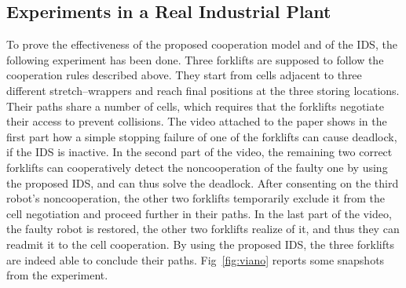 \documentclass[journal, onecolumn, 12pt]{styles/IEEEtran}
\begin{document}
\subsection{Experiments in a Real Industrial Plant}

To prove the effectiveness of the proposed cooperation model and of the IDS, the following experiment has been done. Three forklifts are supposed to follow the cooperation rules described above. They start from cells adjacent to three different stretch--wrappers and reach final positions at the three storing locations. Their paths share a number of cells, which requires that the forklifts negotiate their access to prevent collisions. The video attached to the paper shows in the first part how a simple stopping failure of one of the forklifts can cause deadlock, if the IDS is inactive. In the second part of the video, the remaining two correct forklifts can cooperatively detect the noncooperation of the faulty one by using the proposed IDS, and can thus solve the deadlock. After consenting on the third robot's noncooperation, the other two forklifts temporarily exclude it from the cell negotiation and proceed further in their paths. In the last part of the video, the faulty robot is restored, the other two forklifts realize of it, and thus they can readmit it to the cell cooperation. By using the proposed IDS, the three forklifts are indeed able to conclude their paths. Fig~\ref{fig:viano} reports some snapshots from the experiment.
%
\end{document}

